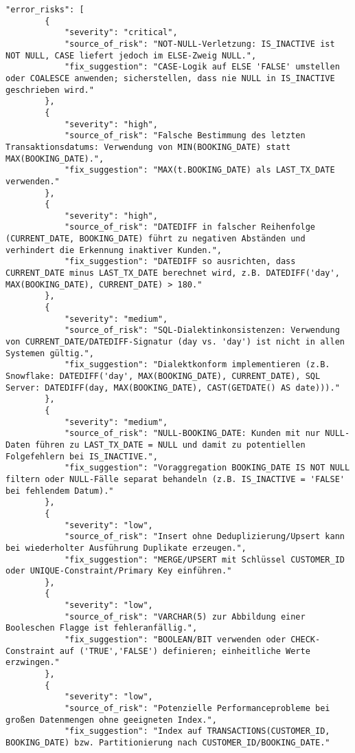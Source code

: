 \begin{lstlisting}[caption={Ausgabe: GPT-5 Anwendungsfall 7 Robustheitsdurchlauf},label={gpt_case7_prompt3}]
    "error_risks": [
        {
            "severity": "critical",
            "source_of_risk": "NOT-NULL-Verletzung: IS_INACTIVE ist NOT NULL, CASE liefert jedoch im ELSE-Zweig NULL.",
            "fix_suggestion": "CASE-Logik auf ELSE 'FALSE' umstellen oder COALESCE anwenden; sicherstellen, dass nie NULL in IS_INACTIVE geschrieben wird."
        },
        {
            "severity": "high",
            "source_of_risk": "Falsche Bestimmung des letzten Transaktionsdatums: Verwendung von MIN(BOOKING_DATE) statt MAX(BOOKING_DATE).",
            "fix_suggestion": "MAX(t.BOOKING_DATE) als LAST_TX_DATE verwenden."
        },
        {
            "severity": "high",
            "source_of_risk": "DATEDIFF in falscher Reihenfolge (CURRENT_DATE, BOOKING_DATE) führt zu negativen Abständen und verhindert die Erkennung inaktiver Kunden.",
            "fix_suggestion": "DATEDIFF so ausrichten, dass CURRENT_DATE minus LAST_TX_DATE berechnet wird, z.B. DATEDIFF('day', MAX(BOOKING_DATE), CURRENT_DATE) > 180."
        },
        {
            "severity": "medium",
            "source_of_risk": "SQL-Dialektinkonsistenzen: Verwendung von CURRENT_DATE/DATEDIFF-Signatur (day vs. 'day') ist nicht in allen Systemen gültig.",
            "fix_suggestion": "Dialektkonform implementieren (z.B. Snowflake: DATEDIFF('day', MAX(BOOKING_DATE), CURRENT_DATE), SQL Server: DATEDIFF(day, MAX(BOOKING_DATE), CAST(GETDATE() AS date)))."
        },
        {
            "severity": "medium",
            "source_of_risk": "NULL-BOOKING_DATE: Kunden mit nur NULL-Daten führen zu LAST_TX_DATE = NULL und damit zu potentiellen Folgefehlern bei IS_INACTIVE.",
            "fix_suggestion": "Voraggregation BOOKING_DATE IS NOT NULL filtern oder NULL-Fälle separat behandeln (z.B. IS_INACTIVE = 'FALSE' bei fehlendem Datum)."
        },
        {
            "severity": "low",
            "source_of_risk": "Insert ohne Deduplizierung/Upsert kann bei wiederholter Ausführung Duplikate erzeugen.",
            "fix_suggestion": "MERGE/UPSERT mit Schlüssel CUSTOMER_ID oder UNIQUE-Constraint/Primary Key einführen."
        },
        {
            "severity": "low",
            "source_of_risk": "VARCHAR(5) zur Abbildung einer Booleschen Flagge ist fehleranfällig.",
            "fix_suggestion": "BOOLEAN/BIT verwenden oder CHECK-Constraint auf ('TRUE','FALSE') definieren; einheitliche Werte erzwingen."
        },
        {
            "severity": "low",
            "source_of_risk": "Potenzielle Performanceprobleme bei großen Datenmengen ohne geeigneten Index.",
            "fix_suggestion": "Index auf TRANSACTIONS(CUSTOMER_ID, BOOKING_DATE) bzw. Partitionierung nach CUSTOMER_ID/BOOKING_DATE."

\end{lstlisting}
